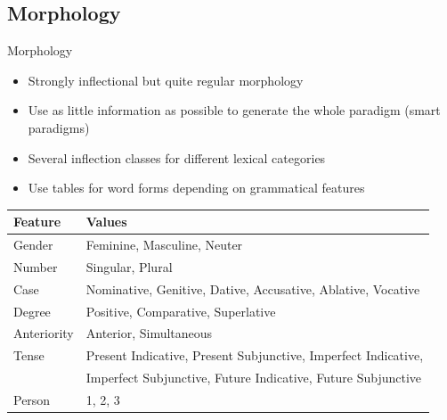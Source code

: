 \documentclass[compress,table]{beamer} %
\begin{document}
\subsection{Morphology}
\begin{frame}{Morphology}
  \begin{itemize}
  \item Strongly inflectional but quite regular morphology
  \item Use as little information as possible to generate the whole paradigm (smart paradigms)
  \item Several inflection classes for different lexical categories
  \item Use tables for word forms depending on grammatical features
  \end{itemize}
\end{frame}
\begin{frame}[fragile]
\begin{table}
    \end{table}
     \begin{table}[h]
      {\small
        \begin{tabular}{l|l}
          Feature & Values \\
          \hline
          Gender & Feminine, Masculine, Neuter \\
          Number & Singular, Plural \\
          Case & Nominative, Genitive, Dative, Accusative, Ablative, Vocative\\
          Degree & Positive, Comparative, Superlative \\
          Anteriority & Anterior, Simultaneous \\
          Tense & Present Indicative, Present Subjunctive, Imperfect Indicative, \\
          & Imperfect Subjunctive, Future Indicative, Future Subjunctive\\
          Person & 1, 2, 3 \\
      \end{tabular}}
    \end{table}
\end{frame}
\end{document}
